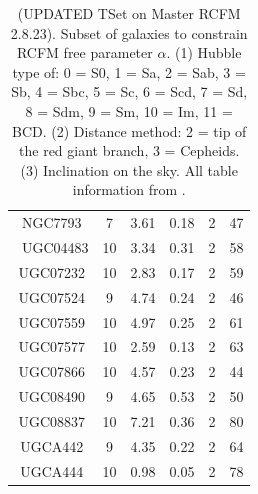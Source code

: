 \documentclass[reprint,%
 amsmath,amssymb,
 aps,
]{revtex4-1}
\begin{document}
\begin{table}[]
\begin{tabular}{|c|c|c|c|c|c|}
NGC7793& 	7& 	3.61& 	0.18&   	2& 	47\\\
UGC04483& 	10& 	3.34& 	0.31& 	2& 	58\\
UGC07232& 	10& 	2.83& 	0.17& 	2& 	59\\
UGC07524& 	9& 	4.74& 	0.24& 	    2& 	46\\
UGC07559& 	10& 	4.97& 	0.25& 	2& 	61\\
UGC07577& 	10& 	2.59& 	0.13& 	2& 	63\\
UGC07866& 	10& 	4.57& 	0.23& 	2& 	44\\
UGC08490& 	9& 	4.65& 	0.53&   	2& 	50\\
UGC08837& 	10& 	7.21& 	0.36& 	2& 	80\\
UGCA442& 	9& 	4.35& 	0.22& 	    2& 	64\\
UGCA444& 	10& 	0.98& 	0.05& 	2& 	78\\
    \hline \hline           
      \end{tabular}
      \caption{{\color{blue}(UPDATED TSet on Master RCFM 2.8.23)}.
      Subset of galaxies to constrain RCFM free parameter $\alpha$.  
      (1) Hubble type 
of: 0 = S0, 1 = Sa, 2 = Sab,
3 = Sb, 4 = Sbc, 5 = Sc, 6 = Scd, 7 = Sd, 8 = Sdm,
9 = Sm, 10 = Im, 11 = BCD. 
(2) Distance method:  
2 = tip of the red giant branch, 3 = Cepheids.  (3) Inclination on the sky. All table information from \citet{2016Lelli}. } \label{tab:Tset}
  \end{table}
 
 
 
\end{document}
